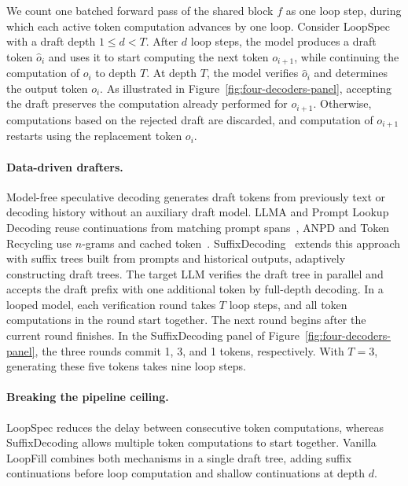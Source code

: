 We count one batched forward pass of the shared block $f$
as one loop step, during which each active token computation
advances by one loop. Consider LoopSpec~\cite{cho2026loopspecpipelinedselfspeculativedecoding}
with a draft depth $1\leq d<T$.
After $d$ loop steps, the model produces a draft token
$\hat o_i$ and uses it to start computing the next token
$o_{i+1}$, while continuing the computation of $o_i$
to depth $T$.
At depth $T$, the model verifies $\hat o_i$ and determines
the output token $o_i$.
As illustrated in Figure~\ref{fig:four-decoders-panel},
accepting the draft preserves the computation already
performed for $o_{i+1}$.
Otherwise, computations based on the rejected draft are
discarded, and computation of $o_{i+1}$ restarts using
the replacement token $o_i$.


\paragraph{Data-driven drafters.}
Model-free speculative decoding generates draft tokens from
previously text or decoding history without an auxiliary
draft model. LLMA and Prompt Lookup Decoding reuse continuations
from matching prompt spans~\cite{yang2023inferencereferencelosslessacceleration,saxena2023prompt}, ANPD and Token Recycling use $n$-grams and
cached token~\cite{ou-etal-2024-lossless,luo-etal-2025-turning}. 
SuffixDecoding~\cite{oliaro2025suffixdecodingextremespeculativedecoding}
extends this approach with suffix trees built from prompts and
historical outputs, adaptively constructing draft trees. The target LLM verifies the draft tree in parallel and
accepts the draft prefix with one
additional token by full-depth decoding.
In a looped model, each verification round takes $T$ loop steps,
and all token computations in the round start together.
The next round begins after the current round finishes.
In the SuffixDecoding panel of
Figure~\ref{fig:four-decoders-panel},
the three rounds commit 1, 3, and 1 tokens, respectively.
With $T=3$, generating these five tokens takes nine loop steps.


\paragraph{Breaking the pipeline ceiling.}
LoopSpec reduces the delay between consecutive token computations,
whereas SuffixDecoding allows multiple token computations to start
together. Vanilla LoopFill combines both mechanisms in a single draft tree,
adding suffix continuations before loop computation and shallow
continuations at depth $d$.

